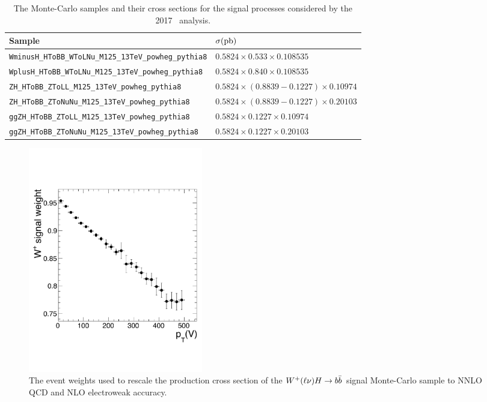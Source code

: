 \begin{table}[htbp]
  \caption[Signal Samples for \VHbb\ 2017]{The Monte-Carlo samples and their cross sections for the signal processes considered by the 2017 \VHbb\ analysis.}
  \label{tbl:MCsignal}
  \small
  \begin{tabularx}{6.5in}{lX}
    \hline
    Sample                                                        & $\sigma (\mathrm{pb})$                                   \\
    \hline
    \texttt{WminusH\_HToBB\_WToLNu\_M125\_13TeV\_powheg\_pythia8} & $0.5824 \times 0.533 \times 0.108535$            \\
    \texttt{WplusH\_HToBB\_WToLNu\_M125\_13TeV\_powheg\_pythia8}  & $0.5824 \times 0.840 \times 0.108535$            \\
    \texttt{ZH\_HToBB\_ZToLL\_M125\_13TeV\_powheg\_pythia8}       & $0.5824 \times (0.8839 - 0.1227) \times 0.10974$ \\
    \texttt{ZH\_HToBB\_ZToNuNu\_M125\_13TeV\_powheg\_pythia8}     & $0.5824 \times (0.8839 - 0.1227) \times 0.20103$ \\
    \texttt{ggZH\_HToBB\_ZToLL\_M125\_13TeV\_powheg\_pythia8}     & $0.5824 \times 0.1227 \times 0.10974$            \\
    \texttt{ggZH\_HToBB\_ZToNuNu\_M125\_13TeV\_powheg\_pythia8}   & $0.5824 \times 0.1227 \times 0.20103$            \\
    \hline
  \end{tabularx}
\end{table}

\begin{figure}[htbp]
  \centering
    \includegraphics[width=3in]{images/ewk_wplush_correction}
    \caption[2017 Signal MC Rescaling Weights for $\bosWp(\ell\nu)\Htobb$]{The event weights used to rescale the production cross section of the $\bosWp(\ell\nu)\Htobb$ signal Monte-Carlo sample to NNLO QCD and NLO electroweak accuracy.}
    \label{fig:VHNNLOweight}
\end{figure}

